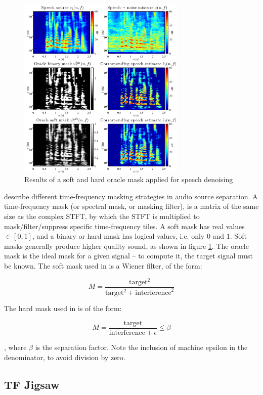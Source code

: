 \documentclass[letter,12pt]{article}
\begin{document}
\begin{figure}
	\vspace{-1.0em}
	\includegraphics[width=8cm]{./maskdemo.png}
	\caption{Results of a soft and hard oracle mask applied for speech denoising}
	\label{fig:masks}
\end{figure}

\citet{masking} describe different time-frequency masking strategies in audio source separation. A time-frequency mask (or spectral mask, or masking filter), is a matrix of the same size as the complex STFT, by which the STFT is multiplied to mask/filter/suppress specific time-frequency tiles. A soft mask has real values $\in [0, 1]$, and a binary or hard mask has logical values, i.e. only 0 and 1. Soft masks generally produce higher quality sound, as shown in figure \ref{fig:masks}. The oracle mask is the ideal mask for a given signal -- to compute it, the target signal must be known. The soft mask used in \cite{fitzgerald1, fitzgerald2} is a Wiener filter, of the form:

\[ M = \frac{\text{target}^{2}}{\text{target}^{2} + \text{interference}^{2}} \]

The hard mask used in \cite{driedger} is of the form:

\[ M = \frac{\text{target}}{\text{interference}+\epsilon} \le \beta \]

, where $\beta$ is the separation factor. Note the inclusion of machine epsilon in the denominator, to avoid division by zero.

\subsection{TF Jigsaw}
\end{document}

